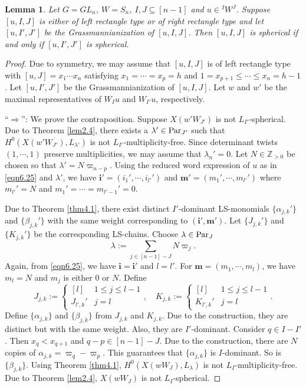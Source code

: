 \documentclass[12pt]{amsart}
\newtheorem{lemma}[theorem]{Lemma}
\theoremstyle{definition}
\theoremstyle{remark}
\newcommand{\Z}{\mathbb{Z}}
\newcommand{\Parj}{{\rm Par}_J}
\begin{document}
\begin{lemma}\label{lem6.3}
Let $G= GL_n$, $W=S_n$, $I,J \subseteq [n-1]$ and $u \in {}^IW^J$. Suppose $[u,I,J]$ is either of left rectangle type or of right rectangle type and let $[u,I',J']$ be the Grassmannianization of $[u,I,J]$. Then $[u,I,J]$ is spherical if and only if $[u,I',J']$ is spherical.
\end{lemma}
\begin{proof}
Due to symmetry, we may assume that $[u,I,J]$ is of left rectangle type with $[u,J] = x_1 \cdots x_n$ satisfying $x_1 = \cdots = x_p = h$ and $1 = x_{p+1 } \leq \cdots \leq x_{n} = h-1$. Let $[u,I',J']$ be the Grassmannianization of $[u,I,J]$. Let $w$ and $w'$ be the maximal representatives of $W_I u$ and $W_{I'} u$, respectively.

``$\Rightarrow$'': We prove the contraposition. Suppose $X(w'W_{J'})$ is not $L_{I'}$-spherical. Due to Theorem \ref{lem2.4}, there exists a $\lambda' \in {\rm Par}_{J'}$ such that $H^0 (X(w'W_{J'}), L_{\lambda'})$ is not $L_{I'}$-multiplicity-free. Since determinant twists $(1, \cdots , 1)$ preserve multiplicities, we may assume that $\lambda_n' = 0$. Let $N \in \Z_{> 0}$ be chosen so that $\lambda ' = N \varpi_{n-p}$. Using the reduced word expression of $u$ as in \eqref{eqn6.25} and $\lambda'$, we have $\mathbf{i'}=(i_1' , \cdots , i_{l'}')$ and $\mathbf{m'} = (m_1' , \cdots , m_{l'}')$ where $m_{l'}' = N$ and $m_1' = \cdots = m_{l'-1}' = 0$.

Due to Theorem \ref{thm4.1}, there exist distinct $I'$-dominant LS-monomials $\{\alpha_{j,k}'\}$ and $\{\beta_{j,k}'\}$ with the same weight corresponding to $(\mathbf{i'},\mathbf{m'})$. Let $\{J_{j,k}'\}$ and $\{K_{j,k}'\}$ be the corresponding LS-chains. Choose $\lambda \in \Parj$
\begin{equation}
\lambda:= \sum_{j \in [n-1]-J} N\varpi_j.
\end{equation}
Again, from \eqref{eqn6.25}, we have $\mathbf{i} = \mathbf{i'}$ and $l=l'$. For $\mathbf{m} = (m_1 , \cdots , m_l)$, we have $m_l = N$ and $m_j$ is either $0$ or $N$. Define
\begin{equation}
J_{j,k}:=
\begin{cases}
[l] & 1 \leq j \leq l-1 \\
J_{l',k}' & j = l
\end{cases}
, \quad K_{j,k} :=
\begin{cases}
[l] & 1 \leq j \leq l-1 \\
K_{l',k}' & j = l
\end{cases}
.
\end{equation}
Define $\{ \alpha_{j,k} \}$ and $\{\beta_{j,k}\}$ from $J_{j,k}$ and $K_{j,k}$. Due to the construction, they are distinct but with the same weight. Also, they are $I'$-dominant. Consider $q \in I-I'$. Then $x_{q} < x_{q+1}$ and $q-p \in [n-1]-J$. Due to the construction, there are $N$ copies of $\alpha_{j,k} = \varpi_{q} - \varpi_p$. This guarantees that $\{\alpha_{j,k}\}$ is $I$-dominant. So is $\{\beta_{j,k}\}$. Using Theorem \ref{thm4.1}, $H^0(X(wW_J), L_\lambda)$ is not $L_I$-multiplicity-free. Due to Theorem \ref{lem2.4}, $X(wW_J)$ is not $L_I$-spherical.


\end{proof}
\end{document}
